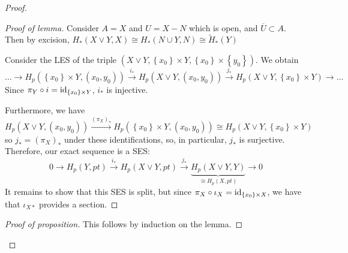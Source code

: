 \begin{proof}
\begin{enumerate}
                \begin{proof}[Proof of lemma]
                    Consider $A = X$ and
                    $U = X - N$ which is open, and
                    $\overline{U} \subset A$. Then by
                    excision,
                    $H_* \left( X \vee Y, X \right) 
                    \cong H_*\left( N \cup Y, N \right) 
                    \cong \tilde{H}_*\left( Y \right) $

                    Consider the LES of the triple
                    $\left( X \vee Y,
                    \left\{ x_0 \right\} \times Y,
                \left\{ x_0 \right\} \times 
            \left\{ y_0 \right\} \right) $. We obtain
            \[
            \ldots \to 
            H_p\left( \left\{ x_0 \right\} \times Y,
            \left( x_0,y_0 \right) \right)
            \stackrel{i_*}{\to}
            H_p\left( X \vee Y, \left( x_0,y_0 \right)  \right) 
            \stackrel{j_*}{\to} H_p\left( X \vee Y,
            \left\{ x_0 \right\} \times Y \right) \to \ldots
            \] 
            Since $\pi_Y \circ i = {\mathrm{id}}_{
            \left\{ x_0 \right\} \times Y} $, 
            $i_*$ is injective.

            Furthermore, we have
            \[
            H_p\left( X \vee Y, 
            \left( x_0, y_0 \right) \right) 
            \stackrel{\left( \pi_X \right)_* }{\to } 
            H_p \left( \left\{ x_0 \right\} \times Y,
            \left( x_0, y_0 \right) \right) 
            \cong H_p\left( X \vee Y , 
            \left\{ x_0 \right\} \times Y \right) 
            \] 
            so $j_* = \left( \pi_X \right)_*$ under these
            identifications, so, in particular, 
            $j_*$ is surjective. Therefore, our exact sequence
            is a SES:
            \[
            0 \to  H_p\left( Y, pt \right)
            \stackrel{i_*}{\to }
            H_p \left( X \vee Y, pt \right) 
            \stackrel{j_*}{\to }
            \underbrace{H_p \left( X \vee Y, Y \right)}_{
            \cong H_p\left( X, pt \right) } \to 0
            \] 
            It remains to show that this SES is split, but
            since
            $\pi_X \circ \iota_{X} = 
            {\mathrm{id}}_{\left\{ x_0 \right\} \times X}$,
            we have that $\iota_{X*}$ provides a section.

        \end{proof}

        \begin{proof}[Proof of proposition]
            This follows by induction on the lemma.
        \end{proof}


\end{enumerate}
\end{proof}
